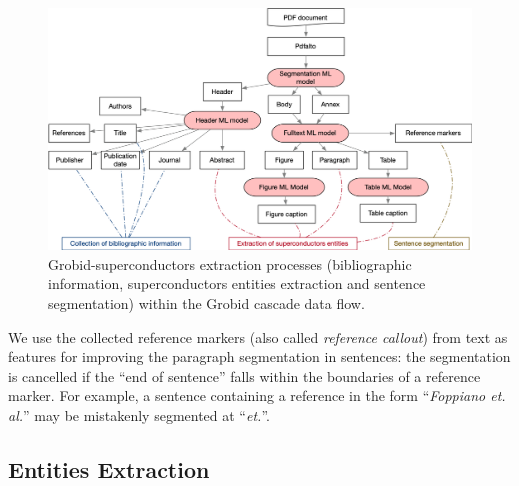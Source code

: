 \documentclass[]{interact}
\theoremstyle{plain}%
\theoremstyle{definition}
\theoremstyle{remark}
\begin{document}
\begin{figure}[ht]
\includegraphics[width=\textwidth]{document-structuring-colors}
\caption{Grobid-superconductors extraction processes (bibliographic information, superconductors entities extraction and sentence segmentation) within the Grobid cascade data flow.}
\label{fig:grobid-document-processing}
\end{figure}

We use the collected reference markers (also called \textit{reference callout}) from text as features for improving the paragraph segmentation in sentences: the segmentation is cancelled if the ``end of sentence'' falls within the boundaries of a reference marker. 
For example, a sentence containing a reference in the form ``\textit{Foppiano et. al.}'' may be mistakenly segmented at ``\textit{et.}''.



\subsection{Entities Extraction}
\label{subsubsec:extraction}
\end{document}
